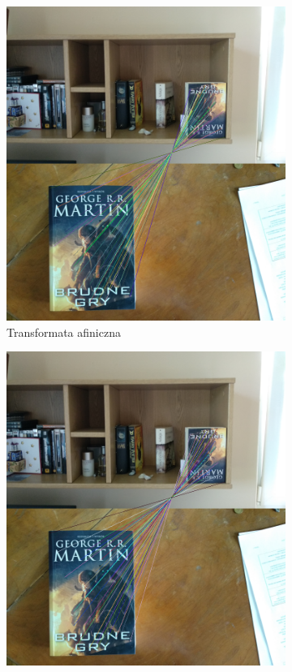 \documentclass{article}
\begin{document}
	\begin{figure}[H]
		\centering
		\begin{subfigure}[b]{0.4\linewidth}
			\includegraphics[width=\linewidth]{a1-match.png}
			\caption{Transformata afiniczna}
		\end{subfigure}
		\begin{subfigure}[b]{0.4\linewidth}
			\includegraphics[width=\linewidth]{p1-match.png}

\end{subfigure}
\end{figure}
\end{document}
